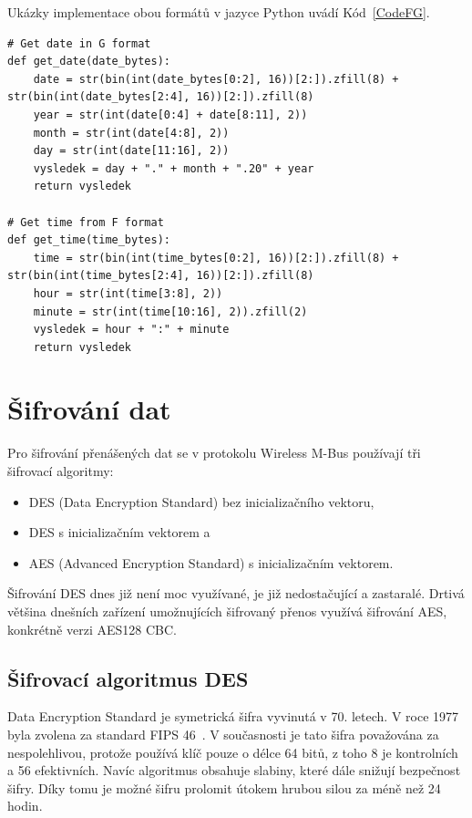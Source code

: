 Ukázky implementace obou formátů v jazyce Python uvádí Kód~\ref{CodeFG}.

\begin{lstlisting}[caption={Implementace F a G formátu},captionpos=b,label=CodeFG,style=MyCodePython]
# Get date in G format
def get_date(date_bytes):
    date = str(bin(int(date_bytes[0:2], 16))[2:]).zfill(8) + str(bin(int(date_bytes[2:4], 16))[2:]).zfill(8)
    year = str(int(date[0:4] + date[8:11], 2))
    month = str(int(date[4:8], 2))
    day = str(int(date[11:16], 2))
    vysledek = day + "." + month + ".20" + year
    return vysledek

# Get time from F format
def get_time(time_bytes):
    time = str(bin(int(time_bytes[0:2], 16))[2:]).zfill(8) + str(bin(int(time_bytes[2:4], 16))[2:]).zfill(8)
    hour = str(int(time[3:8], 2))
    minute = str(int(time[10:16], 2)).zfill(2)
    vysledek = hour + ":" + minute
    return vysledek
\end{lstlisting}
	
\newpage{}	
	
\section{Šifrování dat}
Pro šifrování přenášených dat se v protokolu Wireless M-Bus používají tři šifrovací algoritmy:
\begin{itemize}
	\item DES (Data Encryption Standard) bez inicializačního vektoru,
	\item DES s inicializačním vektorem a
	\item AES (Advanced Encryption Standard) s inicializačním vektorem.
\end{itemize}

Šifrování DES dnes již není moc využívané, je již nedostačující a zastaralé. Drtivá většina dnešních zařízení umožnujících šifrovaný přenos využívá šifrování AES, konkrétně verzi AES128 CBC.

\subsection{Šifrovací algoritmus DES}
Data Encryption Standard je symetrická šifra vyvinutá v 70. letech. V roce 1977 byla zvolena za standard FIPS 46~\cite{NormaFIPS46}. V současnosti je tato šifra považována za nespolehlivou, protože používá klíč pouze o délce 64 bitů, z toho 8 je kontrolních a 56 efektivních. Navíc algoritmus obsahuje slabiny, které dále snižují bezpečnost šifry. Díky tomu je možné šifru prolomit útokem hrubou silou za méně než 24 hodin.

